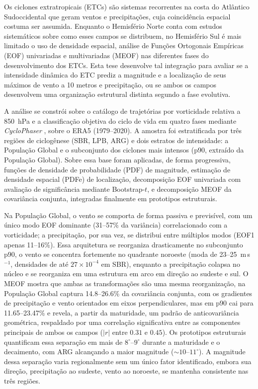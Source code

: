 Os ciclones extratropicais (ETCs) são sistemas recorrentes na costa do Atlântico Sudoccidental que geram ventos e precipitações, cuja coincidência espacial costuma ser assumida.
Enquanto o Hemisfério Norte conta com estudos sistemáticos sobre como esses campos se distribuem, no Hemisfério Sul é mais limitado o uso de densidade espacial, análise de Funções Ortogonais Empíricas (EOF) univariadas e multivariadas (MEOF) nas diferentes fases do desenvolvimento dos ETCs.
Esta tese desenvolve tal integração para avaliar se a intensidade dinâmica do ETC prediz a magnitude e a localização de seus máximos de vento a 10 metros e precipitação, ou se ambos os campos desenvolvem uma organização estrutural distinta segundo a fase evolutiva.

A análise se constrói sobre o catálogo de trajetórias por vorticidade relativa a 850~hPa \citep{gramcianinov2020analysis} e a classificação objetiva do ciclo de vida em quatro fases mediante \textit{CycloPhaser} \citep{coutodesouza2024new, deSouza2025CycloPhaser}, sobre o ERA5 (1979--2020).
A amostra foi estratificada por três regiões de ciclogênese (SBR, LPB, ARG) e dois estratos de intensidade: a População Global e o subconjunto dos ciclones mais intensos (p90, extraído da População Global).
Sobre essa base foram aplicadas, de forma progressiva, funções de densidade de probabilidade (PDF) de magnitude, estimação de densidade espacial (PDFe) de localização, decomposição EOF univariada com avaliação de significância mediante Bootstrap-$t$, e decomposição MEOF da covariância conjunta, integradas finalmente em prototipos estruturais.

Na População Global, o vento se comporta de forma passiva e previsível, com um único modo EOF dominante (31--57\% da variância) correlacionado com a vorticidade; a precipitação, por sua vez, se distribui entre múltiplos modos (EOF1 apenas 11--16\%).
Essa arquitetura se reorganiza drasticamente no subconjunto p90, o vento se concentra fortemente no quadrante noroeste (moda de 23--25~m\,s$^{-1}$, densidades de até $27\times10^{-4}$ em SBR), enquanto a precipitação colapsa no núcleo e se reorganiza em uma estrutura em arco em direção ao sudeste e sul.
O MEOF mostra que ambas as transformações são uma mesma reorganização, na População Global captura 14.8--26.6\% da covariância conjunta, com os gradientes de precipitação e vento orientados em eixos perpendiculares, mas em p90 cai para 11.65--23.47\% e revela, a partir da maturidade, um padrão de anticovariância geométrica, respaldado por uma correlação significativa entre as componentes principais de ambos os campos ($|r|$ entre $0.31$ e $0.45$).
Os prototipos estruturais quantificam essa separação em mais de $8^{\circ}$--$9^{\circ}$ durante a maturidade e o decaimento, com ARG alcançando a maior magnitude (${\sim}10$--$11^{\circ}$).
A magnitude dessa separação varia regionalmente sem um único fator identificado, embora sua direção, precipitação ao sudeste, vento ao noroeste, se mantenha consistente nas três regiões.

